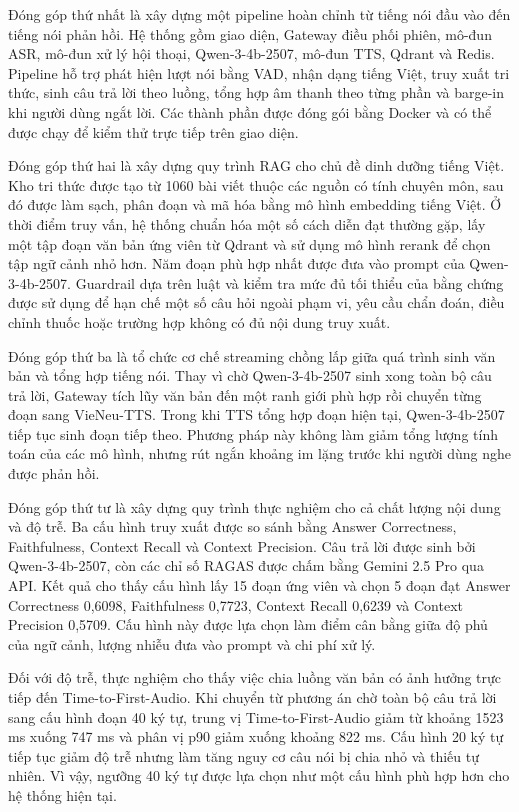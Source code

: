 \documentclass[a4paper,13pt,twoside]{report}
\begin{document}
Đóng góp thứ nhất là xây dựng một pipeline hoàn chỉnh từ tiếng nói đầu vào đến tiếng nói phản hồi. Hệ thống gồm giao diện, Gateway điều phối phiên, mô-đun ASR, mô-đun xử lý hội thoại, Qwen-3-4b-2507, mô-đun TTS, Qdrant và Redis. Pipeline hỗ trợ phát hiện lượt nói bằng VAD, nhận dạng tiếng Việt, truy xuất tri thức, sinh câu trả lời theo luồng, tổng hợp âm thanh theo từng phần và barge-in khi người dùng ngắt lời. Các thành phần được đóng gói bằng Docker và có thể được chạy để kiểm thử trực tiếp trên giao diện.

Đóng góp thứ hai là xây dựng quy trình RAG cho chủ đề dinh dưỡng tiếng Việt. Kho tri thức được tạo từ 1060 bài viết thuộc các nguồn có tính chuyên môn, sau đó được làm sạch, phân đoạn và mã hóa bằng mô hình embedding tiếng Việt. Ở thời điểm truy vấn, hệ thống chuẩn hóa một số cách diễn đạt thường gặp, lấy một tập đoạn văn bản ứng viên từ Qdrant và sử dụng mô hình rerank để chọn tập ngữ cảnh nhỏ hơn. Năm đoạn phù hợp nhất được đưa vào prompt của Qwen-3-4b-2507. Guardrail dựa trên luật và kiểm tra mức đủ tối thiểu của bằng chứng được sử dụng để hạn chế một số câu hỏi ngoài phạm vi, yêu cầu chẩn đoán, điều chỉnh thuốc hoặc trường hợp không có đủ nội dung truy xuất.

Đóng góp thứ ba là tổ chức cơ chế streaming chồng lấp giữa quá trình sinh văn bản và tổng hợp tiếng nói. Thay vì chờ Qwen-3-4b-2507 sinh xong toàn bộ câu trả lời, Gateway tích lũy văn bản đến một ranh giới phù hợp rồi chuyển từng đoạn sang VieNeu-TTS. Trong khi TTS tổng hợp đoạn hiện tại, Qwen-3-4b-2507 tiếp tục sinh đoạn tiếp theo. Phương pháp này không làm giảm tổng lượng tính toán của các mô hình, nhưng rút ngắn khoảng im lặng trước khi người dùng nghe được phản hồi.

Đóng góp thứ tư là xây dựng quy trình thực nghiệm cho cả chất lượng nội dung và độ trễ. Ba cấu hình truy xuất được so sánh bằng Answer Correctness, Faithfulness, Context Recall và Context Precision. Câu trả lời được sinh bởi Qwen-3-4b-2507, còn các chỉ số RAGAS được chấm bằng Gemini 2.5 Pro qua API. Kết quả cho thấy cấu hình lấy 15 đoạn ứng viên và chọn 5 đoạn đạt Answer Correctness 0,6098, Faithfulness 0,7723, Context Recall 0,6239 và Context Precision 0,5709. Cấu hình này được lựa chọn làm điểm cân bằng giữa độ phủ của ngữ cảnh, lượng nhiễu đưa vào prompt và chi phí xử lý.

Đối với độ trễ, thực nghiệm cho thấy việc chia luồng văn bản có ảnh hưởng trực tiếp đến Time-to-First-Audio. Khi chuyển từ phương án chờ toàn bộ câu trả lời sang cấu hình đoạn 40 ký tự, trung vị Time-to-First-Audio giảm từ khoảng 1523 ms xuống 747 ms và phân vị p90 giảm xuống khoảng 822 ms. Cấu hình 20 ký tự tiếp tục giảm độ trễ nhưng làm tăng nguy cơ câu nói bị chia nhỏ và thiếu tự nhiên. Vì vậy, ngưỡng 40 ký tự được lựa chọn như một cấu hình phù hợp hơn cho hệ thống hiện tại.
\end{document}
